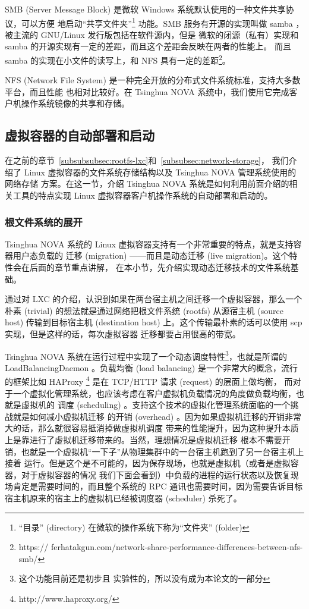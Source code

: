 SMB (Server Message Block) 是微软 Windows 系统默认使用的一种文件共享协议，可以方便
地启动“共享文件夹”\footnote{“目录” (directory) 在微软的操作系统下称为“文件夹” (folder)}
功能。SMB 服务有开源的实现叫做 samba ，被主流的 GNU/Linux 发行版包括在软件源内，但是
微软的闭源（私有）实现和 samba 的开源实现有一定的差距，而且这个差距会反映在两者的性能上。
而且 samba 的实现在小文件的读写上，和 NFS 具有一定的差距\footnote{https://
ferhatakgun.com/network-share-performance-differences-between-nfs-smb/}。

NFS (Network File System) 是一种完全开放的分布式文件系统标准，支持大多数平台，而且性能
也相对比较好。在 Tsinghua NOVA 系统中，我们使用它完成客户机操作系统镜像的共享和存储。

\subsection{虚拟容器的自动部署和启动}

在之前的章节~\ref{subsubsubsec:rootfs-lxc}和~\ref{subsubsec:network-storage}，
我们介绍了 Linux 虚拟容器的文件系统存储结构以及 Tsinghua NOVA 管理系统使用的网络存储
方案。在这一节，介绍 Tsinghua NOVA 系统是如何利用前面介绍的相关工具的特点实现 Linux
虚拟容器客户机操作系统的自动部署和启动的。

\subsubsection{根文件系统的展开}
\label{subsubsec:deployment-rootfs}

Tsinghua NOVA 系统的 Linux 虚拟容器支持有一个非常重要的特点，就是支持容器用户态负载的
迁移 (migration) ——而且是动态迁移 (live migration)。这个特性会在后面的章节重点讲解，
在本小节，先介绍实现动态迁移技术的文件系统基础。

通过对 LXC 的介绍，认识到如果在两台宿主机之间迁移一个虚拟容器，那么一个朴素 (trivial)
的想法就是通过网络把根文件系统 (rootfs) 从源宿主机 (source host) 传输到目标宿主机
(destination host) 上。这个传输最朴素的话可以使用 scp 实现，但是这样的话，每次虚拟容器
迁移都要占用很高的带宽。

Tsinghua NOVA 系统在运行过程中实现了一个动态调度特性\footnote{这个功能目前还是初步且
实验性的，所以没有成为本论文的一部分}，也就是所谓的 LoadBalancingDaemon 。负载均衡
(load balancing) 是一个非常大的概念，流行的框架比如 HAProxy
\footnote{http://www.haproxy.org/} 是在 TCP/HTTP 请求 (request) 的层面上做均衡，
而对于一个虚拟化管理系统，也应该考虑在客户虚拟机负载情况的角度做负载均衡，也就是虚拟机的
调度 (scheduling) 。支持这个技术的虚拟化管理系统面临的一个挑战就是如何减小虚拟机迁移
的开销 (overhead) 。因为如果虚拟机迁移的开销非常大的话，那么就很容易抵消掉做虚拟机调度
带来的性能提升，因为这种提升本质上是靠进行了虚拟机迁移带来的。当然，理想情况是虚拟机迁移
根本不需要开销，也就是一个虚拟机“一下子”从物理集群中的一台宿主机跑到了另一台宿主机上接着
运行。但是这个是不可能的，因为保存现场，也就是虚拟机（或者是虚拟容器，对于虚拟容器的情况
我们下面会看到）中负载的进程的运行状态以及恢复现场肯定是需要时间的，而且整个系统的 RPC
通讯也需要时间，因为需要告诉目标宿主机原来的宿主上的虚拟机已经被调度器 (scheduler) 杀死了。


